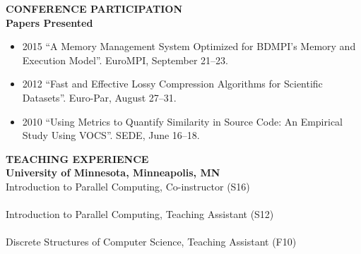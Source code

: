 \documentclass[a4paper,12pt]{article}
\newcommand{\lskip}[1]{\hspace*{1em}\\[#1\baselineskip]}
\newenvironment{Itemize}[0]{
  \vspace{-\parskip}\begin{itemize}
}{
  \end{itemize}
}
\begin{document}
\textbf{CONFERENCE PARTICIPATION}
\lskip{1}
%
\textbf{Papers Presented}
\begin{Itemize}
  \item[2015] ``A Memory Management System Optimized for BDMPI's Memory and
              Execution Model''. EuroMPI, September 21--23.

  \item[2012] ``Fast and Effective Lossy Compression Algorithms for Scientific
              Datasets''. Euro-Par, August 27--31.

  \item[2010] ``Using Metrics to Quantify Similarity in Source Code: An
              Empirical Study Using VOCS''. SEDE, June 16--18.
\end{Itemize}


\textbf{TEACHING EXPERIENCE}
\lskip{1}
%
\textbf{University of Minnesota, Minneapolis, MN}\\
%
Introduction to Parallel Computing, Co-instructor (S16)\\
  \hspace*{1em}{\footnotesize Design and deliver weekly lectures, design and
    grade assignments, and hold office hours.}\\
%
Introduction to Parallel Computing, Teaching Assistant (S12)\\
  \hspace*{1em}{\footnotesize Gave two guest lectures, held office hours, and
    graded assignments.}\\
%
Discrete Structures of Computer Science, Teaching Assistant (F10)\\
  \hspace*{1em}{\footnotesize Lead weekly recitations, held office hours, and
    graded assignments.}%
%
%
%
%
%
%
\end{document}
